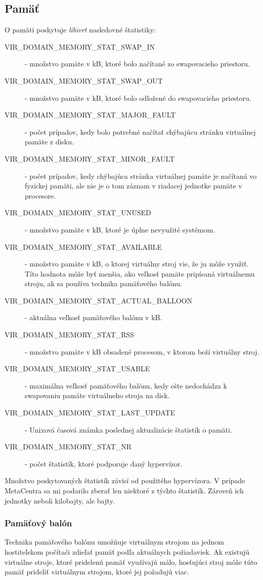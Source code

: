 \documentclass[12pt,twoside,color,cover,table]{fithesis3}
\begin{document}
\subsection{Pamäť}
O pamäti poskytuje \textit{libivrt} nasledovné štatistiky:
\begin{description}
\item[VIR\_DOMAIN\_MEMORY\_STAT\_SWAP\_IN] - množstvo pamäte v kB, ktoré bolo načítané zo swapovacieho priestoru.
\item[VIR\_DOMAIN\_MEMORY\_STAT\_SWAP\_OUT] - množstvo pamäte v kB, ktoré bolo odložené do swapovacieho priestoru.
\item[VIR\_DOMAIN\_MEMORY\_STAT\_MAJOR\_FAULT] - počet prípadov, kedy bolo potrebné načítať chýbajúcu stránku virtuálnej pamäte z disku.
\item[VIR\_DOMAIN\_MEMORY\_STAT\_MINOR\_FAULT] - počet prípadov, kedy chýbajúca stránka virtuálnej pamäte je načítaná vo fyzickej pamäti, ale nie je o tom záznam v riadacej jednotke pamäte v procesore.
\item[VIR\_DOMAIN\_MEMORY\_STAT\_UNUSED] - množstvo pamäte v kB, ktoré je úplne nevyužité systémom.
\item[VIR\_DOMAIN\_MEMORY\_STAT\_AVAILABLE] - množstvo pamäte v kB, o ktorej virtuálny stroj vie, že ju môže využiť. Títo hodnota môže byť menšia, ako veľkosť pamäte pripísaná virtuálnemu stroju, 
ak sa používa technika pamäťového balónu.
\item[VIR\_DOMAIN\_MEMORY\_STAT\_ACTUAL\_BALLOON] - aktuálna veľkosť pamäťového balónu v kB.
\item[VIR\_DOMAIN\_MEMORY\_STAT\_RSS] - množstvo pamäte v kB obsadené procesom, v ktorom beží virtuálny stroj.
\item[VIR\_DOMAIN\_MEMORY\_STAT\_USABLE] - maximálna veľkosť pamäťového balónu, kedy ešte nedochádza k swapovaniu pamäte virtuálneho stroja na disk.
\item[VIR\_DOMAIN\_MEMORY\_STAT\_LAST\_UPDATE] - Unixová časová známka poslednej aktualizácie štatistík o pamäti.
\item[VIR\_DOMAIN\_MEMORY\_STAT\_NR] - počet štatistík, ktoré podporuje daný hypervízor.
\end{description}
Množstvo poskytovaných štatistík závisí od použitého hypervízora. V prípade MetaCentra sa mi podarilo zberať len niektoré z týchto štatistík. Zároveň ich jednotky neboli kilobajty, ale bajty.

\subsubsection{Pamäťový balón}
Technika pamäťového balónu umožňuje virtuálnym strojom na jednom hostiteľskom počítači zdieľať pamäť podľa aktuálnych požiadaviek. Ak existujú virtuálne stroje, ktoré pridelenú pamäť využívajú málo,
hosťujúci stroj môže túto pamäť prideliť virtuálnym strojom, ktoré jej požadujú viac.
\end{document}
